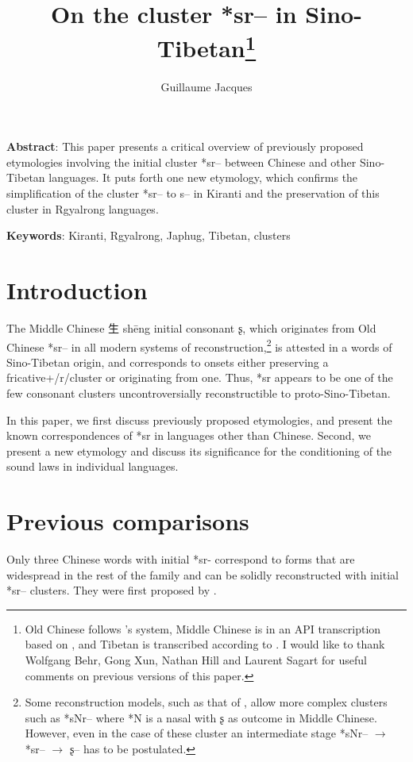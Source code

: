 \documentclass[oldfontcommands,oneside,a4paper,11pt]{article}
\newcommand{\ipa}[1]{{\phon #1}} %
\newcommand{\zh}[1]{{\cn #1}}
\begin{document}
 


\title{On the cluster *sr-- in Sino-Tibetan\footnote{Old Chinese follows \citealt{bs14oc}'s system, Middle Chinese is in an API transcription based on \citet{baxter92}, and Tibetan is transcribed according to \citet{jacques12transcription}. I would like to thank  Wolfgang Behr, Gong Xun, Nathan Hill and Laurent Sagart for useful comments on previous versions of this paper.}  
}
\author{Guillaume Jacques}
\maketitle


\textbf{Abstract}: This paper presents a critical overview of previously proposed etymologies involving the initial cluster *\ipa{sr--} between Chinese and other Sino-Tibetan languages. It puts forth one new etymology, which confirms the simplification of the cluster *\ipa{sr--} to \ipa{s--} in Kiranti and the preservation of this cluster in Rgyalrong languages.


\textbf{Keywords}: Kiranti, Rgyalrong, Japhug, Tibetan, clusters


\section{Introduction}

The Middle Chinese \zh{生} shēng initial consonant \ipa{ʂ}, which originates from Old Chinese *\ipa{sr--} in all modern systems of reconstruction,\footnote{Some reconstruction models, such as that of \citet{bs14oc}, allow more complex clusters such as *\ipa{sNr--} where *N is a nasal with \ipa{ʂ} as outcome in Middle Chinese. However, even in the case of these cluster an intermediate stage *\ipa{sNr--} $\rightarrow$ *\ipa{sr--} $\rightarrow$  \ipa{ʂ--} has to be postulated.} is attested in a words of Sino-Tibetan origin, and corresponds to onsets either preserving a fricative+/r/cluster or originating from one. Thus, *\ipa{sr} appears to be  one of the few consonant clusters uncontroversially reconstructible to proto-Sino-Tibetan. 

In this paper, we first discuss previously proposed etymologies, and present the known correspondences of *\ipa{sr} in languages other than Chinese. Second, we present a new etymology and discuss its significance for the conditioning of the sound laws in individual languages.

\section{Previous comparisons} \label{sec:previous}
Only three Chinese words with initial *\ipa{sr-} correspond to forms that are widespread in the rest of the family and can be solidly reconstructed with initial *\ipa{sr--} clusters.  They were first proposed by \citet{benedict72}.
\end{document}
